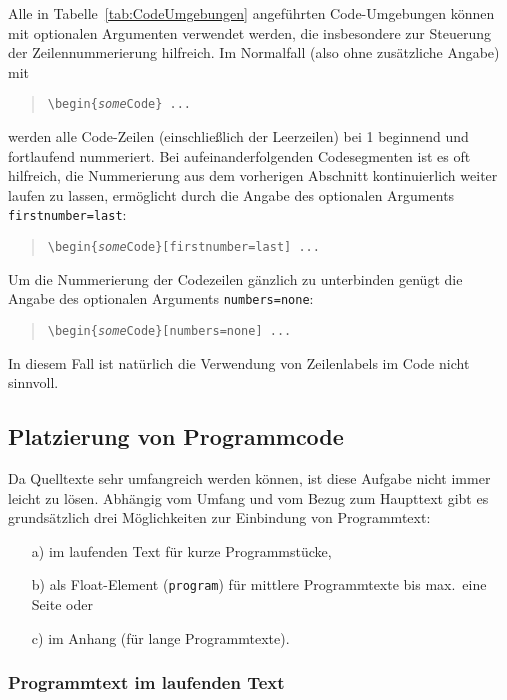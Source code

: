 Alle in Tabelle~\ref{tab:CodeUmgebungen} angeführten Code-Umgebungen können
mit optionalen Argumenten verwendet werden, die insbesondere zur Steuerung
der Zeilennummerierung hilfreich. Im Normalfall (also ohne zusätzliche
Angabe) mit
%
\begin{quote}
	\verb!\begin{!\texttt{\emph{some}Code}\verb!} ... !
\end{quote}
%
werden alle Code-Zeilen (einschließlich der Leerzeilen) bei 1 beginnend und
fortlaufend nummeriert. Bei aufeinanderfolgenden Codesegmenten ist es oft
hilfreich, die Nummerierung aus dem vorherigen Abschnitt kontinuierlich
weiter laufen zu lassen, ermöglicht durch die Angabe des optionalen Arguments
\texttt{firstnumber={\obnh}last}:
%
\begin{quote}
	\verb!\begin{!\texttt{\emph{some}Code}\verb!}[firstnumber=last] ... !
\end{quote}
%
Um die Nummerierung der Codezeilen gänzlich zu unterbinden genügt die Angabe
des optionalen Arguments \texttt{numbers={\obnh}none}:
%
\begin{quote}
	\verb!\begin{!\texttt{\emph{some}Code}\verb!}[numbers=none] ... !
\end{quote}
%
In diesem Fall ist natürlich die Verwendung von Zeilenlabels im Code nicht
sinnvoll.


\subsection{Platzierung von Programmcode}

Da Quelltexte sehr umfangreich werden können, ist diese Aufgabe nicht immer
leicht zu lösen. Abhängig vom Umfang und vom Bezug zum Haupttext gibt es
grundsätzlich drei Möglichkeiten zur Einbindung von Programmtext:
%
\begin{itemize}
	\item[a)] im laufenden Text für kurze Programmstücke,
	\item[b)] als Float-Element (\texttt{program}) für mittlere Programmtexte
	bis max.\ eine Seite oder
	\item[c)] im Anhang (für lange Programmtexte).
\end{itemize}

\subsubsection{Programmtext im laufenden Text}

